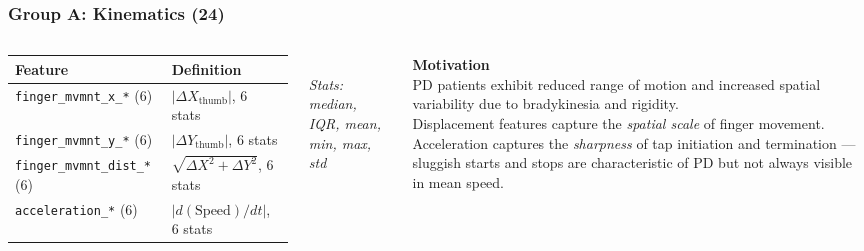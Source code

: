\documentclass[aspectratio=169]{beamer}
\begin{document}
\begin{frame}
    \frametitle{Group A: Kinematics (24)}
    \scriptsize
    \begin{columns}[T]
        \renewcommand{\arraystretch}{1.2}
        \begin{tabular}{p{4.0cm}p{3.0cm}}
            \toprule
            \textbf{Feature} & \textbf{Definition} \\
            \midrule
            \texttt{finger\_mvmnt\_x\_*} (6) & $|\Delta X_\text{thumb}|$, 6 stats \\
            \texttt{finger\_mvmnt\_y\_*} (6) & $|\Delta Y_\text{thumb}|$, 6 stats \\
            \texttt{finger\_mvmnt\_dist\_*} (6) & $\sqrt{\Delta X^2+\Delta Y^2}$, 6 stats \\
            \texttt{acceleration\_*} (6) & $|d(\text{Speed})/dt|$, 6 stats \\
            \bottomrule
        \end{tabular}\\[0.3em]
        \emph{Stats: median, IQR, mean, min, max, std}

        \textbf{Motivation}\\[0.3em]
        PD patients exhibit reduced range of motion and increased spatial variability due to bradykinesia and rigidity.\\[0.4em]
        Displacement features capture the \emph{spatial scale} of finger movement. Acceleration captures the \emph{sharpness} of tap initiation and termination --- sluggish starts and stops are characteristic of PD but not always visible in mean speed.
    \end{columns}
\end{frame}
\end{document}
